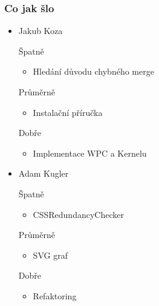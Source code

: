 \documentclass{beamer}
\begin{document}
\begin{frame}[allowframebreaks]\frametitle{Co jak šlo}
  \begin{itemize}
    \item Jakub Koza
     \begin{block}{Špatně} %
       \begin{itemize}
        \item Hledání důvodu chybného merge
       \end{itemize}
     \end{block}
     \begin{block}{Průměrně} %
        \begin{itemize}
        \item Instalační příručka
       \end{itemize}
     \end{block}
     \begin{block}{Dobře} %
       \begin{itemize}
        \item Implementace WPC a Kernelu
       \end{itemize}
     \end{block}
   
    \item Adam Kugler
      \begin{block}{Špatně} %
       \begin{itemize}
        \item CSSRedundancyChecker
       \end{itemize}
     \end{block}
     \begin{block}{Průměrně} %
        \begin{itemize}
         \item SVG graf
       \end{itemize}
     \end{block}
     \begin{block}{Dobře} %
       \begin{itemize}
        \item Refaktoring
       \end{itemize}
     \end{block}
  

\end{itemize}
\end{frame}
\end{document}
